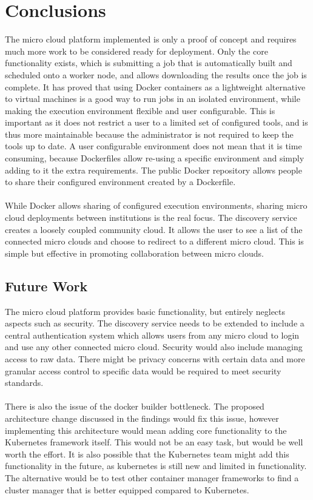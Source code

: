 \documentclass{sig-alternate-05-2015}
\begin{document}
\section{Conclusions}
The micro cloud platform implemented is only a proof of concept and requires much more work to be considered ready for deployment. Only the core functionality exists, which is submitting a job that is automatically built and scheduled onto a worker node, and allows downloading the results once the job is complete. It has proved that using Docker containers as a lightweight alternative to virtual machines is a good way to run jobs in an isolated environment, while making the execution environment flexible and user configurable. This is important as it does not restrict a user to a limited set of configured tools, and is thus more maintainable because the administrator is not required to keep the tools up to date. A user configurable environment does not mean that it is time consuming, because Dockerfiles allow re-using a specific environment and simply adding to it the extra requirements. The public Docker repository allows people to share their configured environment created by a Dockerfile. 
\\\\
While Docker allows sharing of configured execution environments, sharing micro cloud deployments between institutions is the real focus. The discovery service creates a loosely coupled community cloud. It allows the user to see a list of the connected micro clouds and choose to redirect to a different micro cloud. This is simple but effective in promoting collaboration between micro clouds.

\subsection{Future Work}
The micro cloud platform provides basic functionality, but entirely neglects aspects such as security. The discovery service needs to be extended to include a central authentication system which allows users from any micro cloud to login and use any other connected micro cloud. Security would also include managing access to raw data. There might be privacy concerns with certain data and more granular access control to specific data would be required to meet security standards.
\\\\
There is also the issue of the docker builder bottleneck. The proposed architecture change discussed in the findings would fix this issue, however implementing this architecture would mean adding core functionality to the Kubernetes framework itself. This would not be an easy task, but would be well worth the effort. It is also possible that the Kubernetes team might add this functionality in the future, as kubernetes is still new and limited in functionality. The alternative would be to test other container manager frameworks to find a cluster manager that is better equipped compared to Kubernetes.
\end{document}
